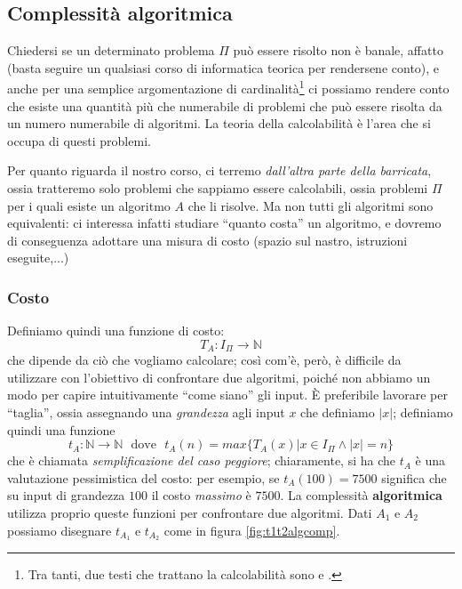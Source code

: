 \subsection{Complessità algoritmica}
Chiedersi se un determinato problema $\Pi$ può essere risolto
non è banale, affatto (basta seguire un qualsiasi corso di informatica teorica
per rendersene conto), e anche per una semplice argomentazione di cardinalità\footnote{
	Tra tanti, due testi che trattano la calcolabilità sono \cite{hopcroft_1979} e
	\cite{kfoury_1982}.
}
ci possiamo rendere conto che esiste una quantità più che numerabile di problemi
che può essere risolta da un numero numerabile di algoritmi. La teoria della
calcolabilità è l'area che si occupa di questi problemi.

Per quanto riguarda il nostro corso, ci terremo {\it dall'altra parte della
barricata}, ossia tratteremo solo problemi che sappiamo essere calcolabili,
ossia problemi $\Pi$ per i quali esiste un algoritmo $A$ che li risolve. Ma non
tutti gli algoritmi sono equivalenti: ci interessa infatti studiare ``quanto
costa'' un algoritmo, e dovremo di conseguenza adottare una misura di costo
(spazio sul nastro, istruzioni eseguite,...)

\subsubsection{Costo}
Definiamo quindi una funzione di costo:
$$
	T_A : I_{\Pi} \rightarrow \mathbb{N}
$$
che dipende da ciò che vogliamo calcolare; così com'è, però, è difficile da
utilizzare con l'obiettivo di confrontare due algoritmi, poiché non abbiamo un
modo per capire intuitivamente ``come siano'' gli input. \`E preferibile
lavorare per ``taglia'', ossia assegnando una {\it grandezza} agli input $x$ che
definiamo $|x|$; definiamo quindi una funzione
$$
	t_A:\mathbb{N} \rightarrow \mathbb{N} ~~~ \text{dove} ~~~ t_A(n) = max\{T_A(x)|x \in I_{\Pi} \land |x| = n\}
$$
che è chiamata \textit{semplificazione del caso peggiore}; chiaramente, si ha
che $t_A$ è una valutazione pessimistica del costo: per esempio, se $t_A(100) =
7500$ significa che su input di grandezza $100$ il costo \textit{massimo} è
$7500$. La complessità \textbf{algoritmica} utilizza proprio queste funzioni per
confrontare due algoritmi. Dati $A_1$ e $A_2$ possiamo disegnare $t_{A_1}$ e
$t_{A_2}$ come in figura \ref{fig:t1t2algcomp}.


